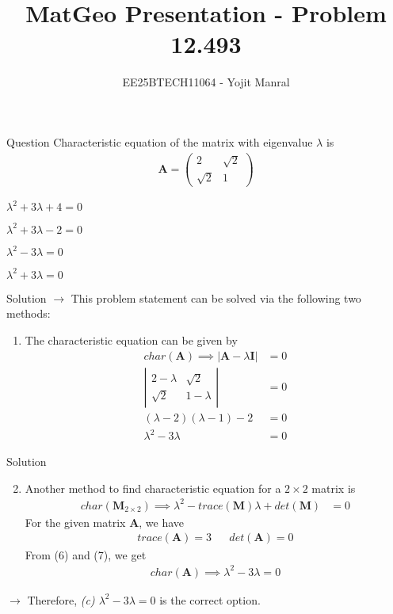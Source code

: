 \documentclass{beamer}
\title{MatGeo Presentation - Problem 12.493}
\author{EE25BTECH11064 - Yojit Manral}
\date{}
\numberwithin{equation}{section}
\theoremstyle{remark}
\newcommand{\myvec}[1]{\ensuremath{\begin{pmatrix}#1\end{pmatrix}}}
\let\vec\mathbf
\begin{document}
\frame{\titlepage}
\begin{frame}{Question}
Characteristic equation of the matrix with eigenvalue $\lambda$ is
\begin{align}
    \vec{A} = \myvec{2&\sqrt{2}\\ \sqrt{2}&1}
\end{align}
\begin{enumerate}[label=(\alph*)]
\begin{multicols}{2}
    \item $\lambda^2+3\lambda+4=0$
    \item $\lambda^2+3\lambda-2=0$
    \item $\lambda^2-3\lambda=0$
    \item $\lambda^2+3\lambda=0$
\end{multicols}
\end{enumerate}
\end{frame}

\begin{frame}{Solution}
$\longrightarrow$ This problem statement can be solved via the following two methods:
\newline
\begin{enumerate}[label=\arabic*)]
    \item {
    The characteristic equation can be given by
    \begin{align}
        char(\vec{A}) \implies |\vec{A}-\lambda\vec{I}| &= 0 \\
        \left|\begin{array}{cc}2-\lambda&\sqrt{2}\\ \sqrt{2}&1-\lambda\end{array}\right| &= 0 \\
        (\lambda-2)(\lambda-1)-2 &= 0 \\
        \lambda^2-3\lambda &= 0
    \end{align}
    }
\end{enumerate}
\end{frame}

\begin{frame}{Solution}
\begin{enumerate}[label=\arabic*)]\setcounter{enumi}{1}
    \item {
    Another method to find characteristic equation for a $2\times2$ matrix is
    \begin{align}
        char(\vec{M}_{2\times2}) \implies \lambda^2-trace(\vec{M})\lambda+det(\vec{M}) &= 0
    \end{align}
    For the given matrix $\vec{A}$, we have
    \begin{align} trace(\vec{A}) = 3 && det(\vec{A}) = 0 \end{align}
    From (6) and (7), we get
    \begin{align}
        char(\vec{A}) \implies \lambda^2-3\lambda = 0
    \end{align}
    }
\end{enumerate}
$\longrightarrow$ Therefore, \textit{(c) $\lambda^2-3\lambda=0$} is the correct option.
\end{frame}
\end{document}

